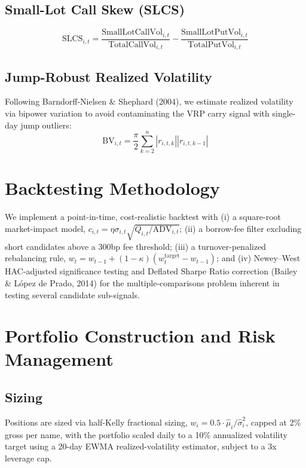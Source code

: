 \documentclass[11pt]{report}
\begin{document}
\section{Small-Lot Call Skew (SLCS)}
\begin{equation}
    \text{SLCS}_{i,t} = \frac{\text{SmallLotCallVol}_{i,t}}{\text{TotalCallVol}_{i,t}}
    - \frac{\text{SmallLotPutVol}_{i,t}}{\text{TotalPutVol}_{i,t}}
\end{equation}

\section{Jump-Robust Realized Volatility}
Following Barndorff-Nielsen \& Shephard (2004), we estimate realized volatility via
bipower variation to avoid contaminating the VRP carry signal with single-day jump
outliers:
\begin{equation}
    \text{BV}_{i,t} = \frac{\pi}{2} \sum_{k=2}^{n} |r_{i,t,k}||r_{i,t,k-1}|
\end{equation}

\chapter{Backtesting Methodology}

We implement a point-in-time, cost-realistic backtest with (i) a square-root
market-impact model, $c_{i,t} = \eta \sigma_{i,t}\sqrt{Q_{i,t}/\text{ADV}_{i,t}}$; (ii) a
borrow-fee filter excluding short candidates above a 300bp fee threshold; (iii) a
turnover-penalized rebalancing rule, $w_t = w_{t-1} + (1-\kappa)(w_t^{\text{target}} -
w_{t-1})$; and (iv) Newey--West HAC-adjusted significance testing and Deflated Sharpe
Ratio correction (Bailey \& López de Prado, 2014) for the multiple-comparisons problem
inherent in testing several candidate sub-signals.

\chapter{Portfolio Construction and Risk Management}

\section{Sizing}
Positions are sized via half-Kelly fractional sizing,
$w_i = 0.5 \cdot \hat\mu_i / \hat\sigma_i^2$, capped at 2\% gross per name, with the
portfolio scaled daily to a 10\% annualized volatility target using a 20-day EWMA
realized-volatility estimator, subject to a 3x leverage cap.
\end{document}
